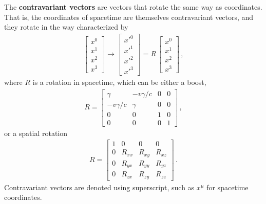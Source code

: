 \documentclass[11pt, onesided]{book}
\theoremstyle{break}
\theoremstyle{break}
\newcommand{\bmat}[1]{\begin{bmatrix} #1 \end{bmatrix}}
\begin{document}
The \textbf{contravariant vectors} are vectors that rotate the same way as coordinates. That is, the coordinates of spacetime are themselves contravariant vectors, and they rotate in the way characterized by
\begin{align*}
\bmat{x^0 \\ x^1 \\ x^2 \\ x^3} \to
\bmat{x'^0 \\ x'^1 \\ x'^2 \\ x'^3} = R\, \bmat{x^0 \\ x^1 \\ x^2 \\ x^3}\,,
\end{align*}
where $R$ is a rotation in spacetime, which can be either a boost,
\begin{align*}R=
\bmat{\gamma & -v\gamma/c & 0 & 0\\
-v\gamma/c & \gamma &0 &0\\
0 &0 &1 &0\\
0 & 0&0 & 1}\,,
\end{align*}
or a spatial rotation
\begin{align*}
R = \bmat{1 & 0 & 0& 0\\
0 & R_{xx} & R_{xy} & R_{xz}\\
0 & R_{yx} & R_{yy} & R_{yz}\\
0 & R_{zx} & R_{zy} & R_{zz}}\,.
\end{align*}
Contravariant vectors are denoted using superscript, such as $x^\mu$ for spacetime coordinates. \\
\end{document}
